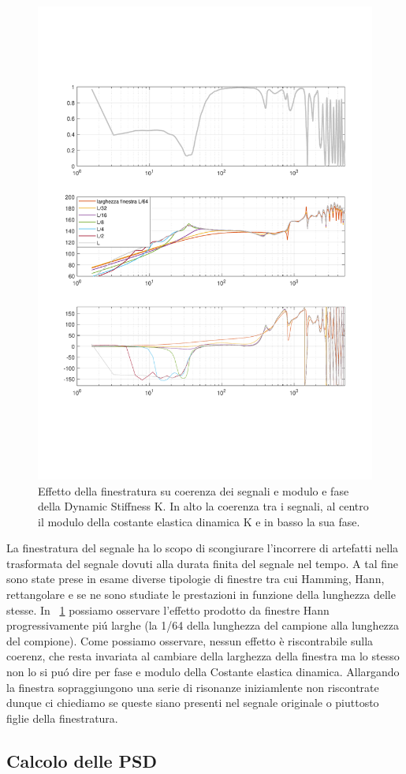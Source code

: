 \documentclass[12pt,a4paper]{article}
\begin{document}
\begin{figure}
	\centering
	\includegraphics[width=16cm]{effettofinestra}
	\caption{Effetto della finestratura su coerenza dei segnali e modulo e fase della Dynamic Stiffness K. In alto la coerenza tra i segnali, al centro il modulo della costante elastica dinamica K e in basso la sua fase.}
	\label{fig:effettofinestra}
\end{figure}

La finestratura del segnale ha lo scopo di scongiurare l'incorrere di artefatti nella trasformata del segnale dovuti alla durata finita del segnale nel tempo. A tal fine sono state prese in esame diverse tipologie di finestre tra cui Hamming, Hann, rettangolare e se ne sono studiate le prestazioni in funzione della lunghezza delle stesse. In \figurename~\ref{fig:effettofinestra} possiamo osservare l'effetto prodotto da finestre Hann progressivamente pi\'u larghe (la 1/64 della lunghezza del campione alla lunghezza del compione). Come possiamo osservare, nessun effetto è riscontrabile sulla coerenz, che resta invariata al cambiare della larghezza della finestra ma lo stesso non lo si pu\'o dire per fase e modulo della Costante elastica dinamica. Allargando la finestra sopraggiungono una serie di risonanze iniziamlente non riscontrate dunque ci chiediamo se queste siano presenti nel segnale originale o piuttosto figlie della finestratura.
\subsection{Calcolo delle PSD}












 
 
\end{document}
